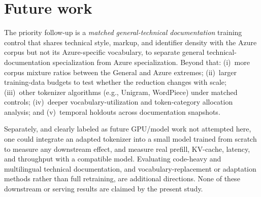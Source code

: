 \section{Future work}
\label{sec:future}

The priority follow-up is a \emph{matched general-technical documentation} training
control that shares technical style, markup, and identifier density with the Azure
corpus but not its Azure-specific vocabulary, to separate general
technical-documentation specialization from Azure specialization. Beyond that:
(i)~more corpus mixture ratios between the General and Azure extremes;
(ii)~larger training-data budgets to test whether the reduction changes with
scale; (iii)~other tokenizer algorithms (e.g., Unigram, WordPiece) under matched
controls; (iv)~deeper vocabulary-utilization and token-category allocation
analysis; and (v)~temporal holdouts across documentation snapshots.

Separately, and clearly labeled as future GPU/model work not attempted here, one
could integrate an adapted tokenizer into a small model trained from scratch to
measure any downstream effect, and measure real prefill, KV-cache, latency, and
throughput with a compatible model. Evaluating code-heavy and multilingual
technical documentation, and vocabulary-replacement or adaptation methods rather
than full retraining, are additional directions. None of these downstream or
serving results are claimed by the present study.
